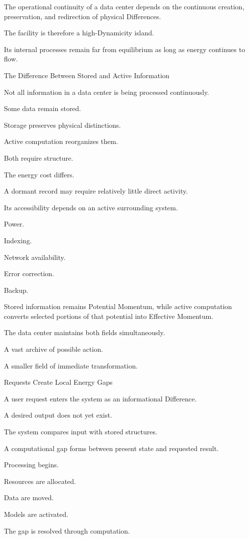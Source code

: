 The operational continuity of a data center depends on the continuous creation, preservation, and redirection of physical Differences.

The facility is therefore a high-Dynamicity island.

Its internal processes remain far from equilibrium as long as energy continues to flow.

The Difference Between Stored and Active Information

Not all information in a data center is being processed continuously.

Some data remain stored.

Storage preserves physical distinctions.

Active computation reorganizes them.

Both require structure.

The energy cost differs.

A dormant record may require relatively little direct activity.

Its accessibility depends on an active surrounding system.

Power.

Indexing.

Network availability.

Error correction.

Backup.

Stored information remains Potential Momentum, while active computation converts selected portions of that potential into Effective Momentum.

The data center maintains both fields simultaneously.

A vast archive of possible action.

A smaller field of immediate transformation.

Requests Create Local Energy Gaps

A user request enters the system as an informational Difference.

A desired output does not yet exist.

The system compares input with stored structures.

A computational gap forms between present state and requested result.

Processing begins.

Resources are allocated.

Data are moved.

Models are activated.

The gap is resolved through computation.

